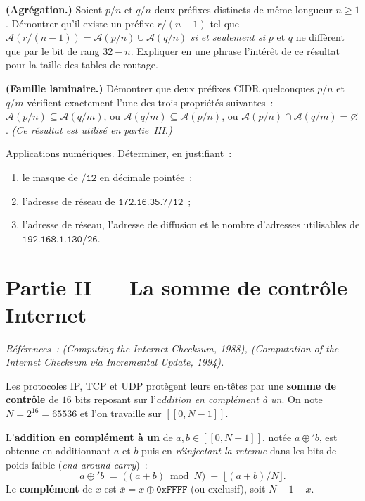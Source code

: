 \documentclass[11pt,a4paper]{article}
\begin{document}
\Q \textbf{(Agrégation.)} Soient $p/n$ et $q/n$ deux préfixes distincts de même longueur
$n\ge 1$. Démontrer qu'il existe un préfixe $r/(n-1)$ tel que
$\mathcal{A}(r/(n-1))=\mathcal{A}(p/n)\cup\mathcal{A}(q/n)$ \emph{si et seulement si} $p$ et
$q$ ne diffèrent que par le bit de rang $32-n$. Expliquer en une phrase l'intérêt de ce
résultat pour la taille des tables de routage.

\Q \textbf{(Famille laminaire.)} Démontrer que deux préfixes CIDR quelconques $p/n$ et $q/m$
vérifient exactement l'une des trois propriétés suivantes~: $\mathcal{A}(p/n)\subseteq
\mathcal{A}(q/m)$, ou $\mathcal{A}(q/m)\subseteq\mathcal{A}(p/n)$, ou
$\mathcal{A}(p/n)\cap\mathcal{A}(q/m)=\varnothing$. \emph{(Ce résultat est utilisé en
partie~III.)}

\Q Applications numériques. Déterminer, en justifiant~:
\begin{enumerate}[label=(\alph*),leftmargin=2em,itemsep=1pt]
\item le masque de $\texttt{/12}$ en décimale pointée~;
\item l'adresse de réseau de $\texttt{172.16.35.7/12}$~;
\item l'adresse de réseau, l'adresse de diffusion et le nombre d'adresses utilisables de
$\texttt{192.168.1.130/26}$.
\end{enumerate}

\section*{Partie II --- La somme de contrôle Internet}

\emph{Références~:  (\emph{Computing the Internet Checksum}, 1988), 
(\emph{Computation of the Internet Checksum via Incremental Update}, 1994).}

\medskip
Les protocoles IP, TCP et UDP protègent leurs en-têtes par une \textbf{somme de contrôle}
de $16$ bits reposant sur l'\emph{addition en complément à un}. On note
$N=2^{16}=65536$ et l'on travaille sur $[\![0,N-1]\!]$.

\begin{defi}
L'\textbf{addition en complément à un} de $a,b\in[\![0,N-1]\!]$, notée $a\oplus' b$, est
obtenue en additionnant $a$ et $b$ puis en \emph{réinjectant la retenue} dans les bits de
poids faible (\emph{end-around carry})~:
\[ a\oplus' b \;=\; \big((a+b)\bmod N\big) \;+\; \big\lfloor (a+b)/N \big\rfloor . \]
Le \textbf{complément} de $x$ est $\overline{x}=x\oplus \texttt{0xFFFF}$ (ou exclusif), soit
$N-1-x$.
\end{defi}
\end{document}
